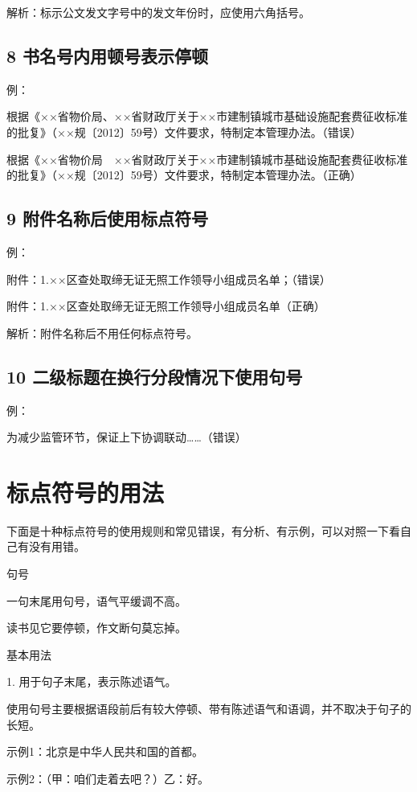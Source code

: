 解析：标示公文发文字号中的发文年份时，应使用六角括号。

\subsection*{8 书名号内用顿号表示停顿}

例：

根据《××省物价局、××省财政厅关于××市建制镇城市基础设施配套费征收标准的批复》（××规〔2012〕59号）文件要求，特制定本管理办法。（错误）

根据《××省物价局　××省财政厅关于××市建制镇城市基础设施配套费征收标准的批复》（××规〔2012〕59号）文件要求，特制定本管理办法。（正确）

\subsection*{9 附件名称后使用标点符号}

例：

附件：1.××区查处取缔无证无照工作领导小组成员名单；（错误）

附件：1.××区查处取缔无证无照工作领导小组成员名单（正确）

解析：附件名称后不用任何标点符号。

\subsection*{10 二级标题在换行分段情况下使用句号}

例：

为减少监管环节，保证上下协调联动……（错误）



\section{标点符号的用法}

下面是十种标点符号的使用规则和常见错误，有分析、有示例，可以对照一下看自己有没有用错。

句号

一句末尾用句号，语气平缓调不高。

读书见它要停顿，作文断句莫忘掉。

基本用法

1. 用于句子末尾，表示陈述语气。

使用句号主要根据语段前后有较大停顿、带有陈述语气和语调，并不取决于句子的长短。

示例1：北京是中华人民共和国的首都。

示例2：（甲：咱们走着去吧？）乙：好。

